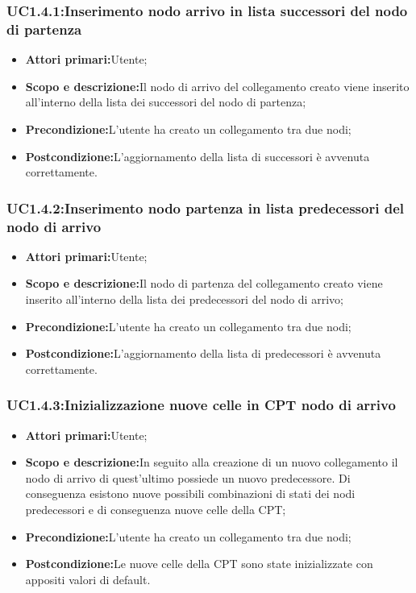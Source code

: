 \subsubsection{UC1.4.1:Inserimento nodo arrivo in lista successori del nodo di partenza}
\begin{itemize}
	\item{\textbf{Attori primari:}Utente;}
	\item{\textbf{Scopo e descrizione:}Il nodo di arrivo del collegamento creato viene inserito all'interno della lista dei successori del nodo di partenza;}
	\item{\textbf{Precondizione:}L'utente ha creato un collegamento tra due nodi;}
	\item{\textbf{Postcondizione:}L'aggiornamento della lista di successori è avvenuta correttamente.}
\end{itemize}
\subsubsection{UC1.4.2:Inserimento nodo partenza in lista predecessori del nodo di arrivo}
\begin{itemize}
	\item{\textbf{Attori primari:}Utente;}
	\item{\textbf{Scopo e descrizione:}Il nodo di partenza del collegamento creato viene inserito all'interno della lista dei predecessori del nodo di arrivo;}
	\item{\textbf{Precondizione:}L'utente ha creato un collegamento tra due nodi;}
	\item{\textbf{Postcondizione:}L'aggiornamento della lista di predecessori è avvenuta correttamente.}
\end{itemize}
\subsubsection{UC1.4.3:Inizializzazione nuove celle in CPT nodo di arrivo}
\begin{itemize}
	\item{\textbf{Attori primari:}Utente;}
	\item{\textbf{Scopo e descrizione:}In seguito alla creazione di un nuovo collegamento il nodo di arrivo di quest'ultimo possiede un nuovo predecessore. Di conseguenza esistono nuove possibili combinazioni di stati dei nodi predecessori e di conseguenza nuove celle della CPT;}
	\item{\textbf{Precondizione:}L'utente ha creato un collegamento tra due nodi;}
	\item{\textbf{Postcondizione:}Le nuove celle della CPT sono state inizializzate con appositi valori di default.}
\end{itemize}
